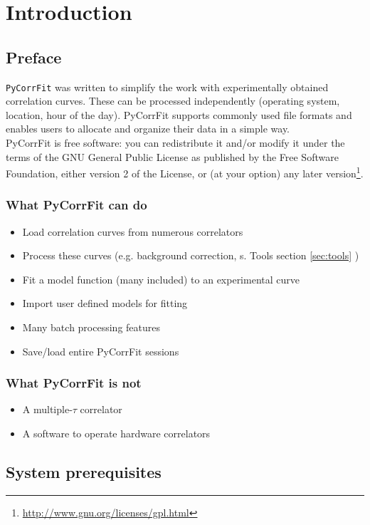 \section{Introduction}

\subsection{Preface}
\texttt{PyCorrFit} was written to simplify the work with experimentally obtained correlation curves. These can be processed independently (operating system, location, hour of the day). PyCorrFit supports commonly used file formats and enables users to allocate and organize their data in a simple way.\\

\noindent PyCorrFit is free software: you can redistribute it and/or modify it
under the terms of the GNU General Public License as published 
by the Free Software Foundation, either version 2 of the License, 
or (at your option) any later version\footnote{\url{http://www.gnu.org/licenses/gpl.html}}.

\subsubsection*{What PyCorrFit can do}
\begin{itemize}
\item Load correlation curves from numerous correlators
\item Process these curves (e.g. background correction, s. Tools section \ref{sec:tools} )
\item Fit a model function (many included) to an experimental curve
\item Import user defined models for fitting
\item Many batch processing features
\item Save/load entire PyCorrFit sessions
\end{itemize}

\subsubsection*{What PyCorrFit is not}
\begin{itemize}
\item A multiple-$\tau$ correlator
\item A software to operate hardware correlators
\end{itemize}

\subsection{System prerequisites}
